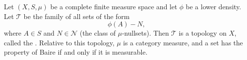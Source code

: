 Let $(X, S, \mu)$ be a complete finite measure space and let $\phi$ be a lower density. Let $\mathcal{T}$ be the family of all sets of the form
$$\phi(A) - N,$$
where $A \in S$ and $N \in \mathcal{N}$ (the class of $\mu$-nullsets). Then $\mathcal{T}$ is a topology on $X$, called the . Relative to this topology, $\mu$ is a category measure, and a set has the property of Baire if and only if it is measurable.
